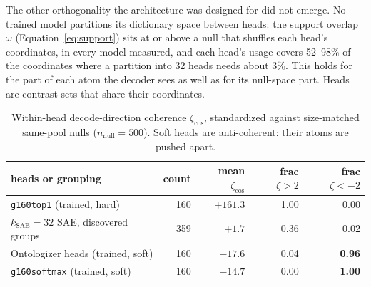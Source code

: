 The other orthogonality the architecture was designed for did not
emerge. No trained model partitions its dictionary space between heads:
the support overlap $\omega$ (Equation~\ref{eq:support}) sits at or above
a null that shuffles each head's coordinates, in every model measured, and
each head's usage covers 52--98\% of the coordinates where a partition
into 32 heads needs about 3\%. This holds for the part of each atom the
decoder sees as well as for its null-space part. Heads are contrast sets
that share their coordinates.

\begin{table}[tp]\centering\small
\begin{tabular}{@{}lrrrr@{}}
\toprule
heads or grouping & count & mean $\zeta_{\cos}$ & frac $\zeta{>}2$ & frac $\zeta{<}{-}2$ \\
\midrule
\texttt{g160top1} (trained, hard)   & 160 & $+161.3$ & 1.00 & 0.00 \\
$k_{\mathrm{SAE}}{=}32$ SAE, discovered groups & 359 & $+1.7$ & 0.36 & 0.02 \\
Ontologizer heads (trained, soft)   & 160 & $-17.6$ & 0.04 & \textbf{0.96} \\
\texttt{g160softmax} (trained, soft) & 160 & $-14.7$ & 0.00 & \textbf{1.00} \\
\bottomrule
\end{tabular}
\caption{Within-head decode-direction coherence $\zeta_{\cos}$,
standardized against size-matched same-pool nulls
($n_{\text{null}}{=}500$). Soft heads are
anti-coherent: their atoms are pushed apart.}
\label{tab:prelim-headcoh}
\end{table}

